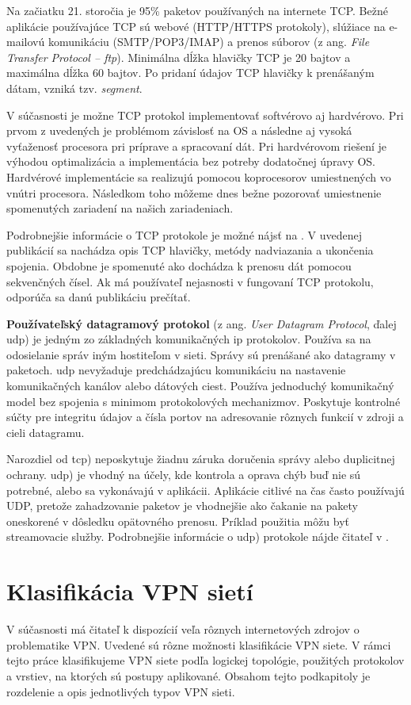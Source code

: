 Na začiatku 21. storočia je 95\% paketov používaných na internete TCP. Bežné aplikácie používajúce TCP sú webové (HTTP/HTTPS protokoly), slúžiace na e-mailovú komunikáciu (SMTP/POP3/IMAP) a prenos súborov (z ang. \textit{File Transfer Protocol -- \acrshort{ftp}}). Minimálna dĺžka hlavičky TCP je 20 bajtov a maximálna dĺžka 60 bajtov. Po pridaní údajov TCP hlavičky k prenášaným dátam, vzniká tzv. \textit{segment}.

V súčasnosti je možne TCP protokol implementovať softvérovo aj hardvérovo. Pri prvom z uvedených je problémom závislosť na OS a následne aj vysoká vyťaženosť procesora pri príprave a spracovaní dát. Pri hardvérovom riešení je výhodou optimalizácia a implementácia bez potreby dodatočnej úpravy OS. Hardvérové implementácie sa realizujú pomocou koprocesorov umiestnených vo vnútri procesora. Následkom toho môžeme dnes bežne pozorovať umiestnenie spomenutých zariadení na našich zariadeniach.

Podrobnejšie informácie o TCP protokole je možné nájsť na \cite{tcp2}. V uvedenej publikácií sa nachádza opis TCP hlavičky, metódy nadviazania a ukončenia spojenia. Obdobne je spomenuté ako dochádza k prenosu dát pomocou sekvenčných čísel. Ak má používateľ nejasnosti v fungovaní TCP protokolu, odporúča sa danú publikáciu prečítať.

\textbf{Používateľský datagramový protokol} (z ang. \textit{User Datagram Protocol}, ďalej \acrshort{udp}) je jedným zo základných komunikačných \acrshort{ip} protokolov. Používa sa na odosielanie správ iným hostiteľom v sieti. Správy sú prenášané ako datagramy v paketoch. \acrshort{udp} nevyžaduje predchádzajúcu komunikáciu na nastavenie komunikačných kanálov alebo dátových ciest. Používa jednoduchý komunikačný model bez spojenia s minimom protokolových mechanizmov. Poskytuje kontrolné súčty pre integritu údajov a čísla portov na adresovanie rôznych funkcií v zdroji a cieli datagramu. 

Narozdiel od \acrshort{tcp}) neposkytuje žiadnu záruka doručenia správy alebo duplicitnej ochrany. 
\acrshort{udp}) je vhodný na účely, kde kontrola a oprava chýb buď nie sú potrebné, alebo sa vykonávajú v aplikácii. Aplikácie citlivé na čas často používajú UDP, pretože zahadzovanie paketov je vhodnejšie ako čakanie na pakety oneskorené v dôsledku opätovného prenosu. Príklad použitia môžu byť streamovacie služby. 
Podrobnejšie informácie o \acrshort{udp}) protokole nájde čitateľ v \cite{udp}.

\section{Klasifikácia VPN sietí}
V súčasnosti má čitateľ k dispozícií veľa rôznych internetových zdrojov o problematike VPN. Uvedené sú rôzne možnosti klasifikácie VPN siete. V rámci tejto práce klasifikujeme VPN siete podľa logickej topológie, použitých protokolov a vrstiev, na ktorých sú postupy aplikované. Obsahom tejto podkapitoly je rozdelenie a opis jednotlivých typov VPN sieti.

